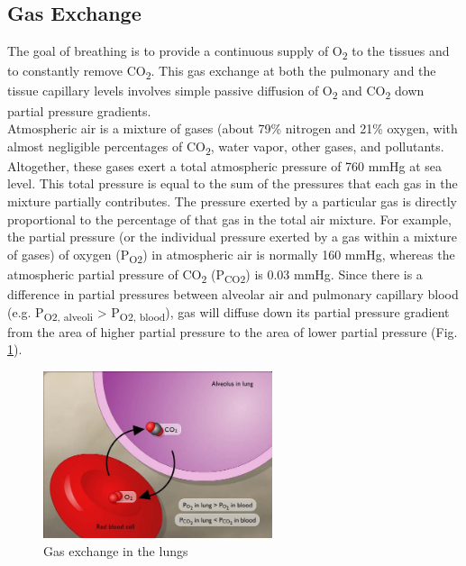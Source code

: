 \documentclass{article}
\begin{document}
\subsection*{Gas Exchange}
The goal of breathing is to provide a continuous supply of O\textsubscript{2} to the tissues and to constantly remove CO\textsubscript{2}. This gas exchange at both the pulmonary and the tissue capillary levels involves simple passive diffusion of O\textsubscript{2} and CO\textsubscript{2} down partial pressure gradients.\\

Atmospheric air is a mixture of gases (about 79\% nitrogen and 21\% oxygen, with almost negligible percentages of CO\textsubscript{2}, water vapor, other gases, and pollutants. Altogether, these gases exert a total atmospheric pressure of 760 mmHg at sea level. This total pressure is equal to the sum of the pressures that each gas in the mixture partially contributes. The pressure exerted by a particular gas is directly proportional to the percentage of that gas in the total air mixture. For example, the partial pressure (or the individual pressure exerted by a gas within a mixture of gases) of oxygen (P\textsubscript{O2}) in atmospheric air is normally 160 mmHg, whereas the atmospheric partial pressure of CO\textsubscript{2} (P\textsubscript{CO2}) is 0.03 mmHg. Since there is a difference in partial pressures between alveolar air and pulmonary capillary blood (e.g. P\textsubscript{O2, alveoli} > P\textsubscript{O2, blood}), gas will diffuse down its partial pressure gradient from the area of higher partial pressure to the area of lower partial pressure (Fig. \ref{partial}).

\begin{figure}[h]
\centering\includegraphics[width=0.6\textwidth]{../images/PF_II_1.jpg}
\caption{Gas exchange in the lungs}
\label{partial}
\end{figure}
\end{document}
